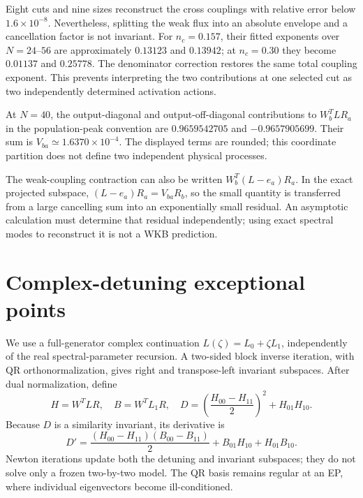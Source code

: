 \documentclass[aps,pra,10pt,onecolumn,superscriptaddress,amsmath,amssymb]{revtex4-2}
\begin{document}
Eight cuts and nine sizes reconstruct the cross couplings with relative error below $1.6\times10^{-8}$. Nevertheless, splitting the weak flux into an absolute envelope and a cancellation factor is not invariant. For $n_c=0.157$, their fitted exponents over $N=24$--$56$ are approximately $0.13123$ and $0.13942$; at $n_c=0.30$ they become $0.01137$ and $0.25778$. The denominator correction restores the same total coupling exponent. This prevents interpreting the two contributions at one selected cut as two independently determined activation actions.

At $N=40$, the output-diagonal and output-off-diagonal contributions to $W_b^TLR_a$ in the population-peak convention are $0.9659542705$ and $-0.9657905699$. Their sum is $V_{ba}\simeq1.6370\times10^{-4}$. The displayed terms are rounded; this coordinate partition does not define two independent physical processes.

The weak-coupling contraction can also be written $W_b^T(L-e_a)R_a$. In the exact projected subspace, $(L-e_a)R_a=V_{ba}R_b$, so the small quantity is transferred from a large cancelling sum into an exponentially small residual. An asymptotic calculation must determine that residual independently; using exact spectral modes to reconstruct it is not a WKB prediction.

\section{Complex-detuning exceptional points}
We use a full-generator complex continuation $L(\zeta)=L_0+\zeta L_1$, independently of the real spectral-parameter recursion. A two-sided block inverse iteration, with QR orthonormalization, gives right and transpose-left invariant subspaces. After dual normalization, define
\begin{equation}
 H=W^TLR,\quad B=W^TL_1R,\quad
 D=\left(\frac{H_{00}-H_{11}}{2}\right)^2+H_{01}H_{10}.
\end{equation}
Because $D$ is a similarity invariant, its derivative is
\begin{equation}
 D'=\frac{(H_{00}-H_{11})(B_{00}-B_{11})}{2}
       +B_{01}H_{10}+H_{01}B_{10}.
\end{equation}
Newton iterations update both the detuning and invariant subspaces; they do not solve only a frozen two-by-two model. The QR basis remains regular at an EP, where individual eigenvectors become ill-conditioned.
\end{document}
